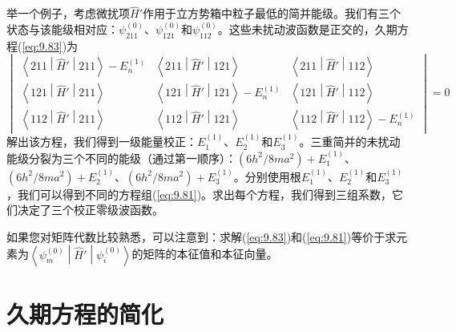     举一个例子，考虑微扰项$\hat{H}'$作用于立方势箱中粒子最低的简并能级。我们有三个状态与该能级相对应：$\psi_{211}^{\left(0\right)}$、$\psi_{121}^{\left(0\right)}$和$\psi_{112}^{\left(0\right)}$。这些未扰动波函数是正交的，久期方程(\ref{eq:9.83})为
    \begin{equation}
        \begin{vmatrix}
            \left\langle 211 \middle| \hat{H}' \middle| 211 \right\rangle - E_n^{\left(1\right)} & \left\langle 211 \middle| \hat{H}' \middle| 121 \right\rangle & \left\langle 211 \middle| \hat{H}' \middle| 112 \right\rangle \\
            \left\langle 121 \middle| \hat{H}' \middle| 211 \right\rangle & \left\langle 121 \middle| \hat{H}' \middle| 121 \right\rangle - E_n^{\left(1\right)} & \left\langle 121 \middle| \hat{H}' \middle| 112 \right\rangle \\
            \left\langle 112 \middle| \hat{H}' \middle| 211 \right\rangle & \left\langle 112 \middle| \hat{H}' \middle| 121 \right\rangle & \left\langle 112 \middle| \hat{H}' \middle| 112 \right\rangle - E_n^{\left(1\right)}
        \end{vmatrix} = 0
        \label{eq:9.87}
    \end{equation}
    解出该方程，我们得到一级能量校正：$E_1^{\left(1\right)}$、$E_2^{\left(1\right)}$和$E_3^{\left(1\right)}$。三重简并的未扰动能级分裂为三个不同的能级（通过第一顺序）：$\left(6h^2/8ma^2\right) + E_1^{\left(1\right)}$、$\left(6h^2/8ma^2\right) + E_2^{\left(1\right)}$、$\left(6h^2/8ma^2\right) + E_3^{\left(1\right)}$。分别使用根$E_1^{\left(1\right)}$、$E_2^{\left(1\right)}$和$E_3^{\left(1\right)}$，我们可以得到不同的方程组(\ref{eq:9.81})。求出每个方程，我们得到三组系数，它们决定了三个校正零级波函数。

    如果您对矩阵代数比较熟悉，可以注意到：求解(\ref{eq:9.83})和(\ref{eq:9.81})等价于求元素为$\left\langle \psi_m^{\left(0\right)} \middle| \hat{H}' \middle| \psi_i^{\left(0\right)} \right\rangle$的矩阵的本征值和本征向量。

\section{久期方程的简化}
\label{sec:9.6 Simplification of the Duration Equation}














